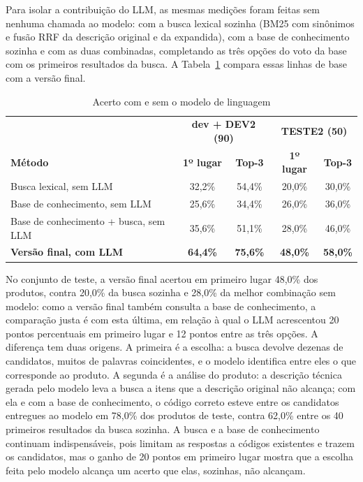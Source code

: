 Para isolar a contribuição do LLM, as mesmas medições foram feitas sem nenhuma chamada ao modelo: com a busca lexical sozinha (BM25 com sinônimos e fusão RRF da descrição original e da expandida), com a base de conhecimento sozinha e com as duas combinadas, completando as três opções do voto da base com os primeiros resultados da busca. A Tabela~\ref{tab:sem_llm} compara essas linhas de base com a versão final.

\begin{table}[H]
\centering
\caption{Acerto com e sem o modelo de linguagem}
\label{tab:sem_llm}
\begin{tabular}{p{6.0cm} c c c c}
\hline
 & \multicolumn{2}{c}{\textbf{dev + DEV2 (90)}} & \multicolumn{2}{c}{\textbf{TESTE2 (50)}} \\
\textbf{Método} & \textbf{1º lugar} & \textbf{Top-3} & \textbf{1º lugar} & \textbf{Top-3} \\
\hline
Busca lexical, sem LLM & 32,2\% & 54,4\% & 20,0\% & 30,0\% \\
Base de conhecimento, sem LLM & 25,6\% & 34,4\% & 26,0\% & 36,0\% \\
Base de conhecimento + busca, sem LLM & 35,6\% & 51,1\% & 28,0\% & 46,0\% \\
\textbf{Versão final, com LLM} & \textbf{64,4\%} & \textbf{75,6\%} & \textbf{48,0\%} & \textbf{58,0\%} \\
\hline
\end{tabular}
\end{table}

No conjunto de teste, a versão final acertou em primeiro lugar 48,0\% dos produtos, contra 20,0\% da busca sozinha e 28,0\% da melhor combinação sem modelo: como a versão final também consulta a base de conhecimento, a comparação justa é com esta última, em relação à qual o LLM acrescentou 20 pontos percentuais em primeiro lugar e 12 pontos entre as três opções. A diferença tem duas origens. A primeira é a escolha: a busca devolve dezenas de candidatos, muitos de palavras coincidentes, e o modelo identifica entre eles o que corresponde ao produto. A segunda é a análise do produto: a descrição técnica gerada pelo modelo leva a busca a itens que a descrição original não alcança; com ela e com a base de conhecimento, o código correto esteve entre os candidatos entregues ao modelo em 78,0\% dos produtos de teste, contra 62,0\% entre os 40 primeiros resultados da busca sozinha. A busca e a base de conhecimento continuam indispensáveis, pois limitam as respostas a códigos existentes e trazem os candidatos, mas o ganho de 20 pontos em primeiro lugar mostra que a escolha feita pelo modelo alcança um acerto que elas, sozinhas, não alcançam.

